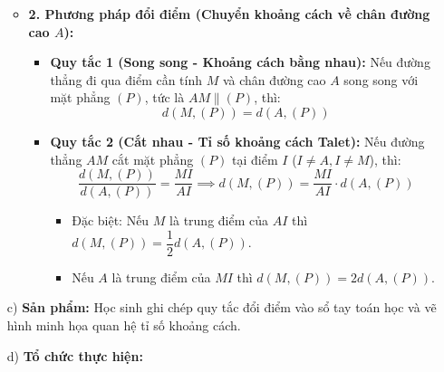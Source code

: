 \documentclass[12pt, a4paper]{article}
\begin{document}
\begin{itemize}[leftmargin=1.2cm]
\begin{itemize}[leftmargin=0.6cm]
        \item \textbf{2. Phương pháp đổi điểm (Chuyển khoảng cách về chân đường cao $A$):}
        \begin{itemize}
            \item \textbf{Quy tắc 1 (Song song - Khoảng cách bằng nhau):}
            Nếu đường thẳng đi qua điểm cần tính $M$ và chân đường cao $A$ song song với mặt phẳng $(P)$, tức là $AM \parallel (P)$, thì:
            $$d(M, (P)) = d(A, (P))$$
            \item \textbf{Quy tắc 2 (Cắt nhau - Tỉ số khoảng cách Talet):}
            Nếu đường thẳng $AM$ cắt mặt phẳng $(P)$ tại điểm $I$ ($I \ne A, I \ne M$), thì:
            $$\dfrac{d(M, (P))}{d(A, (P))} = \dfrac{MI}{AI} \implies d(M, (P)) = \dfrac{MI}{AI} \cdot d(A, (P))$$
            \begin{itemize}
                \item Đặc biệt: Nếu $M$ là trung điểm của $AI$ thì $d(M, (P)) = \dfrac{1}{2} d(A, (P))$.
                \item Nếu $A$ là trung điểm của $MI$ thì $d(M, (P)) = 2 d(A, (P))$.
            \end{itemize}
        \end{itemize}
    \end{itemize}

    \item[c)] \textbf{Sản phẩm:} Học sinh ghi chép quy tắc đổi điểm vào sổ tay toán học và vẽ hình minh họa quan hệ tỉ số khoảng cách.
    \item[d)] \textbf{Tổ chức thực hiện:}
\end{itemize}
\end{document}
